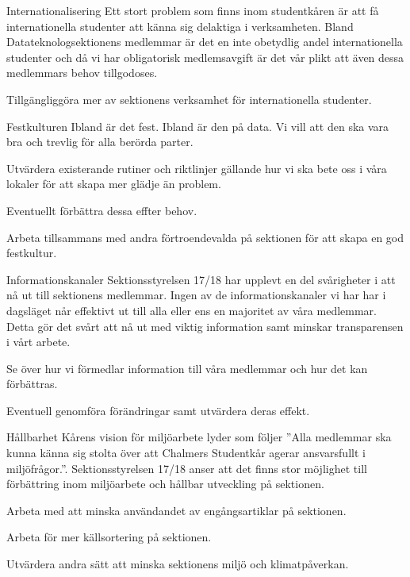 \documentclass{dTeX-base}
\begin{document}
  \begin{FokusPunkt}{Internationalisering}{
    Ett stort problem som finns inom studentkåren är att få internationella
    studenter att känna sig delaktiga i verksamheten.  Bland
    Datateknologsektionens medlemmar är det en inte obetydlig andel
    internationella studenter och då vi har obligatorisk medlemsavgift är det
    vår plikt att även dessa medlemmars behov tillgodoses.
  }
    \item Tillgängliggöra mer av sektionens verksamhet för internationella
      studenter.
  \end{FokusPunkt}

  \begin{FokusPunkt}{Festkulturen}{
    Ibland är det fest. Ibland är den på data. Vi vill att den ska vara bra och
    trevlig för alla berörda parter.
  }
    \item Utvärdera existerande rutiner och riktlinjer gällande hur vi ska bete
      oss i våra lokaler för att skapa mer glädje än problem.
    \item Eventuellt förbättra dessa effter behov.
    \item Arbeta tillsammans med andra förtroendevalda på sektionen för att
      skapa en god festkultur.
  \end{FokusPunkt}

  \begin{FokusPunkt}{Informationskanaler}{
    Sektionsstyrelsen 17/18 har upplevt en del svårigheter i att nå ut till
    sektionens medlemmar. Ingen av de  informationskanaler vi har har i
    dagsläget når effektivt ut till alla eller ens en majoritet av våra
    medlemmar. Detta gör det svårt att nå ut med viktig information samt
    minskar transparensen i vårt arbete.
  }
    \item Se över hur vi förmedlar information till våra medlemmar och hur det
      kan förbättras.
    \item Eventuell genomföra förändringar samt utvärdera deras effekt.
  \end{FokusPunkt}

  \begin{FokusPunkt}{Hållbarhet}{
    Kårens vision för miljöarbete lyder som följer \textnormal{''Alla medlemmar
    ska kunna känna sig stolta över att Chalmers Studentkår agerar ansvarsfullt
    i miljöfrågor.''}. Sektionsstyrelsen 17/18 anser att det finns stor
    möjlighet till förbättring inom miljöarbete och hållbar utveckling på
    sektionen.
  }
    \item Arbeta med att minska användandet av engångsartiklar på sektionen.
    \item Arbeta för mer källsortering på sektionen.
    \item Utvärdera andra sätt att minska sektionens miljö och klimatpåverkan.
  \end{FokusPunkt}
\end{document}
